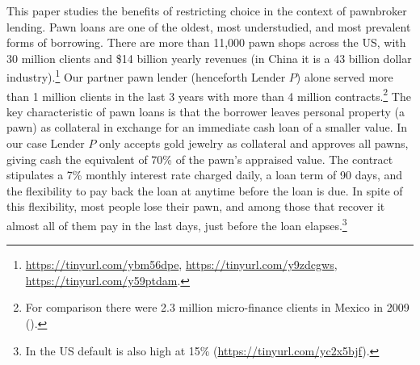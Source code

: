 \documentclass[oneside,11pt]{article}
\begin{document}
This paper studies the benefits of restricting choice in the context of pawnbroker lending. Pawn loans are one of the oldest, most understudied, and most prevalent forms of borrowing. There are more than 11,000 pawn shops across the US, with 30 million clients and \$14 billion yearly revenues (in China it is a 43 billion dollar industry).\footnote{\url{https://tinyurl.com/ybm56dpe}, \url{https://tinyurl.com/y9zdcgws}, \url{https://tinyurl.com/y59ptdam}.} Our partner pawn lender (henceforth Lender $P$) alone served more than 1 million clients in the last 3 years with more than 4 million contracts.\footnote{For comparison there were 2.3 million micro-finance clients in Mexico in 2009 (\cite{Pedroza:2010}).} The key characteristic of pawn loans is that the borrower leaves personal property (a pawn) as collateral in exchange for an immediate cash loan of a smaller value. In our case Lender $P$ only accepts gold jewelry as collateral and approves all pawns, giving cash the equivalent of 70\% of the pawn's appraised value. The contract stipulates a 7\% monthly interest rate charged daily, a loan term of 90 days, and the flexibility to pay back the loan at anytime before the loan is due. In spite of this flexibility, most people lose their pawn, and among those that recover it almost all of them pay in the last days, just before the loan elapses.\footnote{In the US default is also high at 15\% (\url{https://tinyurl.com/yc2x5bjf}).}




\end{document}
